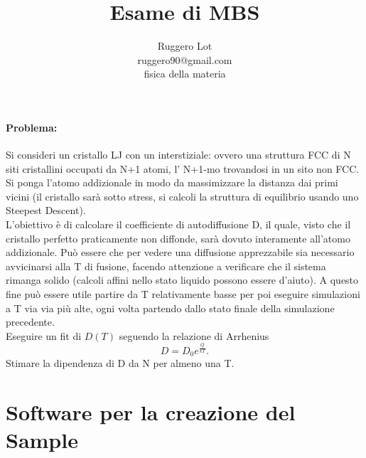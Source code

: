 \documentclass[a4paper,11pt]{article}
\author{Ruggero Lot \\ ruggero90@gmail.com \\ fisica della materia \\}
\title{Esame di MBS}
\begin{document}
	\maketitle
	\paragraph{Problema:} %
	\label{par:problema}
		Si consideri un cristallo LJ con un interstiziale: ovvero una struttura
		FCC di N siti cristallini occupati da N+1 atomi, l' N+1-mo trovandosi in
		un sito non FCC. Si ponga l'atomo addizionale in modo da massimizzare la
		distanza dai primi vicini (il cristallo sarà sotto stress, si calcoli la
		struttura di equilibrio usando uno Steepest Descent).\\
		L'obiettivo è di calcolare il coefficiente di autodiffusione D, il quale,
		visto che il cristallo perfetto praticamente non diffonde, sarà dovuto 
		interamente all'atomo addizionale. Può essere che per vedere una diffusione
		apprezzabile sia necessario avvicinarsi alla T di fusione, facendo
		attenzione a verificare che il sistema rimanga solido (calcoli affini
		nello stato liquido possono essere d'aiuto). A questo fine può essere
		utile partire da T relativamente basse per poi eseguire simulazioni a T
		via via più alte, ogni volta partendo dallo stato finale della simulazione
		precedente.\\
		Eseguire un fit di $D(T)$ seguendo la relazione di Arrhenius
		\begin{equation*}
			D = D_0 e^{\frac{Q}{kT}}. 
		\end{equation*}
		Stimare la dipendenza di D da N per almeno una T.
	\newpage
	\tableofcontents
	\newpage
	\section{Software per la creazione del Sample} %
	\label{sec:software_per_la_creazione_del_sample}
		
\end{document}

